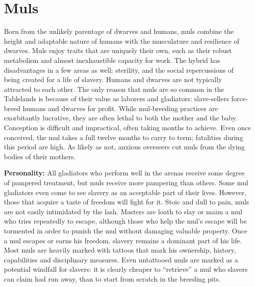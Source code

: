 \section{Muls}

Born from the unlikely parentage of dwarves and humans, muls combine the height and adaptable nature of humans with the musculature and resilience of dwarves. Muls enjoy traits that are uniquely their own, such as their robust metabolism and almost inexhaustible capacity for work. The hybrid has disadvantages in a few areas as well: sterility, and the social repercussions of being created for a life of slavery. Humans and dwarves are not typically attracted to each other. The only reason that muls are so common in the Tablelands is because of their value as laborers and gladiators: slave-sellers force-breed humans and dwarves for profit. While mul-breeding practices are exorbitantly lucrative, they are often lethal to both the mother and the baby. Conception is difficult and impractical, often taking months to achieve. Even once conceived, the mul takes a full twelve months to carry to term; fatalities during this period are high. As likely as not, anxious overseers cut muls from the dying bodies of their mothers.

\textbf{Personality:} All gladiators who perform well in the arenas receive some degree of pampered treatment, but muls receive more pampering than others. Some mul gladiators even come to see slavery as an acceptable part of their lives. However, those that acquire a taste of freedom will fight for it. Stoic and dull to pain, muls are not easily intimidated by the lash. Masters are loath to slay or maim a mul who tries repeatedly to escape, although those who help the mul's escape will be tormented in order to punish the mul without damaging valuable property. Once a mul escapes or earns his freedom, slavery remains a dominant part of his life. Most muls are heavily marked with tattoos that mark his ownership, history, capabilities and disciplinary measures. Even untattooed muls are marked as a potential windfall for slavers: it is clearly cheaper to ``retrieve'' a mul who slavers can claim had run away, than to start from scratch in the breeding pits.

